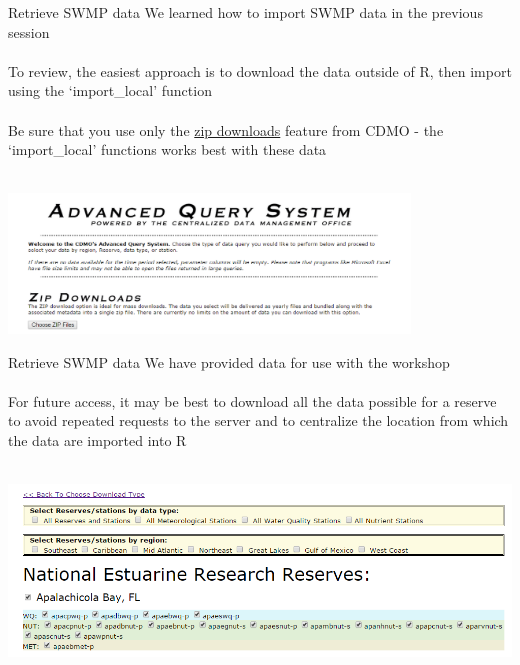 \documentclass[xcolor=svgnames]{beamer}\usepackage[]{graphicx}\usepackage[]{color}
\begin{document}
\begin{frame}{Retrieve SWMP data}
We learned how to import SWMP data in the previous session \\~\\
To review, the easiest approach is to download the data outside of R, then import using the `import_local' function \\~\\
Be sure that you use only the \href{http://cdmo.baruch.sc.edu/aqs/zips.cfm}{zip downloads} feature from CDMO - the `import_local' functions works best with these data \\~\\
\centerline{\includegraphics[width = 0.8\textwidth]{adv_query.png}}
\end{frame}

\begin{frame}[t]{Retrieve SWMP data}
We have provided data for use with the workshop\\~\\
For future access, it may be best to download all the data possible for a reserve to avoid repeated requests to the server and to centralize the location from which the data are imported into R \\~\\
\centerline{\includegraphics[width = \textwidth]{zip_eda.png}}
\end{frame}
\end{document}
